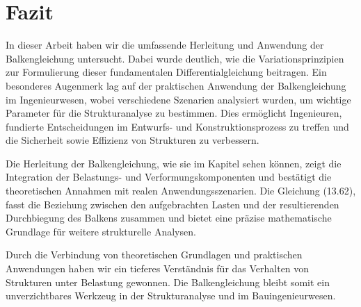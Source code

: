 %
%
%
%
\section{Fazit\label{balken:section:teil4}}

In dieser Arbeit haben wir die umfassende Herleitung und Anwendung der Balkengleichung untersucht. Dabei wurde deutlich, wie die Variationsprinzipien zur Formulierung dieser fundamentalen Differentialgleichung beitragen. Ein besonderes Augenmerk lag auf der praktischen Anwendung der Balkengleichung im Ingenieurwesen, wobei verschiedene Szenarien analysiert wurden, um wichtige Parameter für die Strukturanalyse zu bestimmen. Dies ermöglicht Ingenieuren, fundierte Entscheidungen im Entwurfs- und Konstruktionsprozess zu treffen und die Sicherheit sowie Effizienz von Strukturen zu verbessern.

Die Herleitung der Balkengleichung, wie sie im Kapitel \cite{balken:Balkentheorie} sehen können, zeigt die Integration der Belastungs- und Verformungskomponenten und bestätigt die theoretischen Annahmen mit realen Anwendungsszenarien. Die Gleichung (13.62), fasst die Beziehung zwischen den aufgebrachten Lasten und der resultierenden Durchbiegung des Balkens zusammen und bietet eine präzise mathematische Grundlage für weitere strukturelle Analysen.

Durch die Verbindung von theoretischen Grundlagen und praktischen Anwendungen haben wir ein tieferes Verständnis für das Verhalten von Strukturen unter Belastung gewonnen. Die Balkengleichung bleibt somit ein unverzichtbares Werkzeug in der Strukturanalyse und im Bauingenieurwesen.


